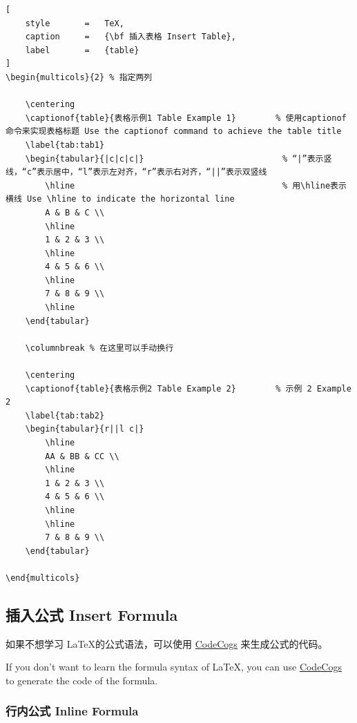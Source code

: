 \documentclass{article}
\begin{document}
\begin{lstlisting}[
    style       =   TeX,
    caption     =   {\bf 插入表格 Insert Table},
    label       =   {table}
]
\begin{multicols}{2} % 指定两列

    \centering
    \captionof{table}{表格示例1 Table Example 1}        % 使用captionof命令来实现表格标题 Use the captionof command to achieve the table title
    \label{tab:tab1}
    \begin{tabular}{|c|c|c|}                            % “|”表示竖线，“c”表示居中，“l”表示左对齐，“r”表示右对齐，“||”表示双竖线    
        \hline                                          % 用\hline表示横线 Use \hline to indicate the horizontal line
        A & B & C \\
        \hline
        1 & 2 & 3 \\
        \hline
        4 & 5 & 6 \\
        \hline
        7 & 8 & 9 \\
        \hline
    \end{tabular}
    
    \columnbreak % 在这里可以手动换行
    
    \centering
    \captionof{table}{表格示例2 Table Example 2}        % 示例 2 Example 2 
    \label{tab:tab2}
    \begin{tabular}{r||l c|}
        \hline
        AA & BB & CC \\
        \hline
        1 & 2 & 3 \\
        4 & 5 & 6 \\
        \hline
        \hline
        7 & 8 & 9 \\
    \end{tabular}
    
\end{multicols}
\end{lstlisting}

\subsection{插入公式 Insert Formula}

如果不想学习 \LaTeX 的公式语法，可以使用 \href{https://www.codecogs.com/latex/eqneditor.php}{CodeCogs} 来生成公式的代码。

If you don't want to learn the formula syntax of \LaTeX, you can use \href{https://www.codecogs.com/latex/eqneditor.php}{CodeCogs} to generate the code of the formula.

\subsubsection{行内公式 Inline Formula}
\end{document}
